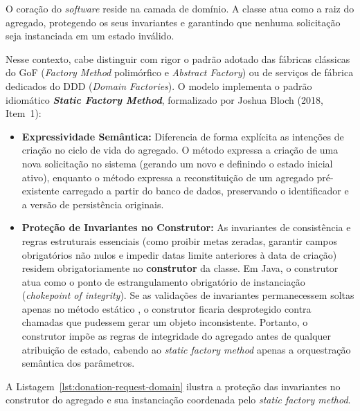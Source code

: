 O coração do \textit{software} reside na camada de domínio. A classe  atua como a raiz do agregado, protegendo os seus invariantes e garantindo que nenhuma solicitação seja instanciada em um estado inválido.

Nesse contexto, cabe distinguir com rigor o padrão adotado das fábricas clássicas do GoF (\textit{Factory Method} polimórfico e \textit{Abstract Factory}) ou de serviços de fábrica dedicados do DDD (\textit{Domain Factories}). O modelo implementa o padrão idiomático \textbf{\textit{Static Factory Method}}, formalizado por Joshua Bloch (2018, Item~1):
\begin{itemize}
  \item \textbf{Expressividade Semântica:} Diferencia de forma explícita as intenções de criação no ciclo de vida do agregado. O método  expressa a criação de uma nova solicitação no sistema (gerando um novo  e definindo o estado inicial ativo), enquanto o método  expressa a reconstituição de um agregado pré-existente carregado a partir do banco de dados, preservando o identificador e a versão de persistência originais.
  \item \textbf{Proteção de Invariantes no Construtor:} As invariantes de consistência e regras estruturais essenciais (como proibir metas zeradas, garantir campos obrigatórios não nulos e impedir datas limite anteriores à data de criação) residem obrigatoriamente no \textbf{construtor} da classe. Em Java, o construtor atua como o ponto de estrangulamento obrigatório de instanciação (\textit{chokepoint of integrity}). Se as validações de invariantes permanecessem soltas apenas no método estático , o construtor ficaria desprotegido contra chamadas que pudessem gerar um objeto inconsistente. Portanto, o construtor impõe as regras de integridade do agregado antes de qualquer atribuição de estado, cabendo ao \textit{static factory method} apenas a orquestração semântica dos parâmetros.
\end{itemize}

A Listagem~\ref{lst:donation-request-domain} ilustra a proteção das invariantes no construtor do agregado e sua instanciação coordenada pelo \textit{static factory method}.

